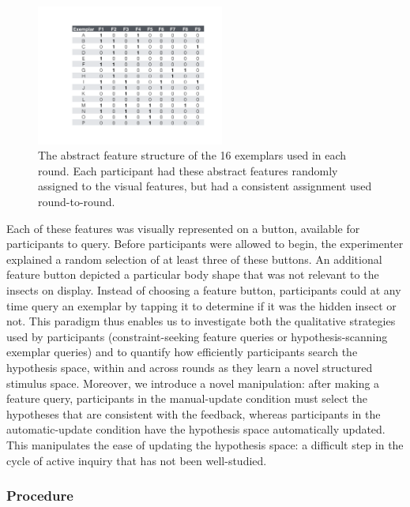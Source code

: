 \documentclass[man,floatsintext]{apa6}
\begin{document}
\begin{figure}[h]
  \centering
  \includegraphics[width=0.55\textwidth]{figures/feature_table}
  \caption{The abstract feature structure of the 16 exemplars used in each round. 
Each participant had these abstract features randomly assigned to the visual 
features, but had a consistent assignment used round-to-round.}
  \label{fig:feature_table}
\end{figure} 

Each of these features was visually represented on a button, available for participants to query. Before 
participants were allowed to begin, the experimenter explained a random selection of at least three of these buttons. 
An additional feature button depicted a particular body shape that was not relevant to the insects on display. 
Instead of choosing a feature button, participants could at any time query an exemplar by tapping it to determine if it was the hidden insect or not. This paradigm thus enables us to investigate both the qualitative strategies used by participants (constraint-seeking feature queries or hypothesis-scanning exemplar queries) and to quantify how efficiently participants search the hypothesis space, within and across rounds as they learn a novel structured stimulus space. Moreover, we introduce a novel manipulation: after making a feature query, participants in the manual-update condition must select the hypotheses that are consistent with the feedback, whereas participants in the automatic-update condition have the hypothesis space automatically updated. This manipulates the ease of updating the hypothesis space: a difficult step in the cycle of active inquiry that has not been well-studied. 

\subsubsection{Procedure}
\end{document}
